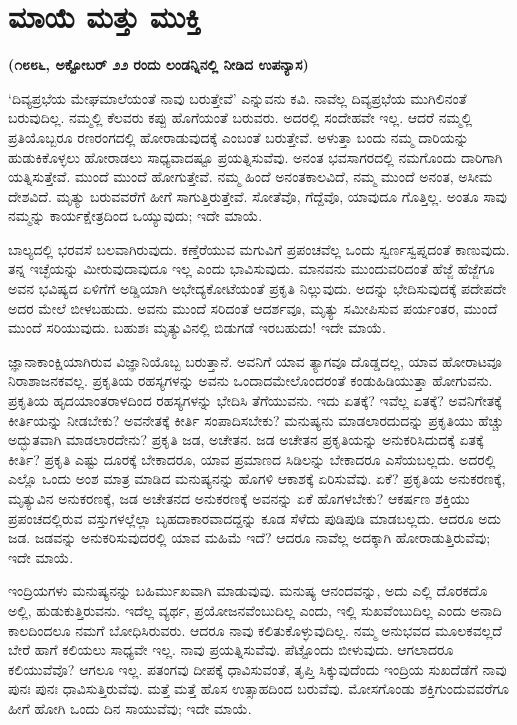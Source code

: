 \chapter{ಮಾಯೆ ಮತ್ತು ಮುಕ್ತಿ}

\centerline{\textbf{(೧೮೮೬, ಅಕ್ಟೋಬರ್​ ೨೨ ರಂದು ಲಂಡನ್ನಿನಲ್ಲಿ ನೀಡಿದ ಉಪನ್ಯಾಸ)}}

\vskip 0.2cm

‘ದಿವ್ಯಪ್ರಭೆಯ ಮೇಘಮಾಲೆಯಂತೆ ನಾವು ಬರುತ್ತೇವೆ’ ಎನ್ನುವನು ಕವಿ. ನಾವೆಲ್ಲ ದಿವ್ಯಪ್ರಭೆಯ ಮುಗಿಲಿನಂತೆ ಬರುವುದಿಲ್ಲ. ನಮ್ಮಲ್ಲಿ ಕೆಲವರು ಕಪ್ಪು ಹೊಗೆಯಂತೆ ಬರುವರು. ಅದರಲ್ಲಿ ಸಂದೇಹವೇ ಇಲ್ಲ. ಆದರೆ ನಮ್ಮಲ್ಲಿ ಪ್ರತಿಯೊಬ್ಬರೂ ರಣರಂಗದಲ್ಲಿ ಹೋರಾಡುವುದಕ್ಕೆ ಎಂಬಂತೆ ಬರುತ್ತೇವೆ. ಅಳುತ್ತಾ ಬಂದು ನಮ್ಮ ದಾರಿಯನ್ನು ಹುಡುಕಿಕೊಳ್ಳಲು ಹೋರಾಡಲು ಸಾಧ್ಯವಾದಷ್ಟೂ ಪ್ರಯತ್ನಿಸುವೆವು. ಅನಂತ ಭವಸಾಗರದಲ್ಲಿ ನಮಗೊಂದು ದಾರಿಗಾಗಿ ಯತ್ನಿಸುತ್ತೇವೆ. ಮುಂದೆ ಮುಂದೆ ಹೋಗುತ್ತೇವೆ. ನಮ್ಮ ಹಿಂದೆ ಅನಂತಕಾಲವಿದೆ, ನಮ್ಮ ಮುಂದೆ ಅನಂತ, ಅಸೀಮ ದೇಶವಿದೆ. ಮೃತ್ಯು ಬರುವವರೆಗೆ ಹೀಗೆ ಸಾಗುತ್ತಿರುತ್ತೇವೆ. ಸೋತೆವೊ, ಗೆದ್ದೆವೊ, ಯಾವುದೂ ಗೊತ್ತಿಲ್ಲ. ಅಂತೂ ಸಾವು ನಮ್ಮನ್ನು ಕಾರ್ಯಕ್ಷೇತ್ರದಿಂದ ಒಯ್ಯುವುದು; ಇದೇ ಮಾಯೆ.

\vskip 0.2cm

ಬಾಲ್ಯದಲ್ಲಿ ಭರವಸೆ ಬಲವಾಗಿರುವುದು. ಕಣ್ತೆರೆಯುವ ಮಗುವಿಗೆ ಪ್ರಪಂಚವೆಲ್ಲ ಒಂದು ಸ್ವರ್ಣಸ್ವಪ್ನದಂತೆ ಕಾಣುವುದು. ತನ್ನ ಇಚ್ಛೆಯನ್ನು ಮೀರುವುದಾವುದೂ ಇಲ್ಲ ಎಂದು ಭಾವಿಸುವುದು. ಮಾನವನು ಮುಂದುವರಿದಂತೆ ಹೆಜ್ಜೆ ಹೆಜ್ಜೆಗೂ ಅವನ ಭವಿಷ್ಯದ ಏಳಿಗೆಗೆ ಅಡ್ಡಿಯಾಗಿ ಅಭೇದ್ಯಕೋಟೆಯಂತೆ ಪ್ರಕೃತಿ ನಿಲ್ಲುವುದು. ಅದನ್ನು ಭೇದಿಸುವುದಕ್ಕೆ ಪದೇಪದೇ ಅದರ ಮೇಲೆ ಬೀಳಬಹುದು. ಅವನು ಮುಂದೆ ಸರಿದಂತೆ ಆದರ್ಶವೂ, ಮೃತ್ಯು ಸಮೀಪಿಸುವ ಪರ್ಯಂತರ, ಮುಂದೆ ಮುಂದೆ ಸರಿಯುವುದು. ಬಹುಶಃ ಮೃತ್ಯುವಿನಲ್ಲಿ ಬಿಡುಗಡೆ ಇರಬಹುದು! ಇದೇ ಮಾಯೆ.

\vskip 0.2cm

ಜ್ಞಾನಾಕಾಂಕ್ಷಿಯಾಗಿರುವ ವಿಜ್ಞಾನಿಯೊಬ್ಬ ಬರುತ್ತಾನೆ. ಅವನಿಗೆ ಯಾವ ತ್ಯಾಗವೂ ದೊಡ್ಡದಲ್ಲ, ಯಾವ ಹೋರಾಟವೂ ನಿರಾಶಾಜನಕವಲ್ಲ. ಪ್ರಕೃತಿಯ ರಹಸ್ಯಗಳನ್ನು ಅವನು ಒಂದಾದಮೇಲೊಂದರಂತೆ ಕಂಡುಹಿಡಿಯುತ್ತಾ ಹೋಗುವನು. ಪ್ರಕೃತಿಯ ಹೃದಯಾಂತರಾಳದಿಂದ ರಹಸ್ಯಗಳನ್ನು ಭೇದಿಸಿ ತೆಗೆಯುವನು. ಇದು ಏತಕ್ಕೆ? ಇವೆಲ್ಲ ಏತಕ್ಕೆ? ಅವನಿಗೇತಕ್ಕೆ ಕೀರ್ತಿಯನ್ನು ನೀಡಬೇಕು? ಅವನೇತಕ್ಕೆ ಕೀರ್ತಿ ಸಂಪಾದಿಸಬೇಕು? ಮನುಷ್ಯನು ಮಾಡಲಾರದುದನ್ನು ಪ್ರಕೃತಿಯು ಹೆಚ್ಚು ಅದ್ಭುತವಾಗಿ ಮಾಡಲಾರದೇನು? ಪ್ರಕೃತಿ ಜಡ, ಅಚೇತನ. ಜಡ ಅಚೇತನ ಪ್ರಕೃತಿಯನ್ನು ಅನುಕರಿಸಿದುದಕ್ಕೆ ಏತಕ್ಕೆ ಕೀರ್ತಿ? ಪ್ರಕೃತಿ ಎಷ್ಟು ದೂರಕ್ಕೆ ಬೇಕಾದರೂ, ಯಾವ ಪ್ರಮಾಣದ ಸಿಡಿಲನ್ನು ಬೇಕಾದರೂ ಎಸೆಯಬಲ್ಲದು. ಅದರಲ್ಲಿ ಎಲ್ಲೊ ಒಂದು ಅಂಶ ಮಾತ್ರ ಮಾಡಿದ ಮನುಷ್ಯನನ್ನು ಹೊಗಳಿ ಆಕಾಶಕ್ಕೆ ಏರಿಸುವೆವು. ಏಕೆ? ಪ್ರಕೃತಿಯ ಅನುಕರಣಕ್ಕೆ, ಮೃತ್ಯುವಿನ ಅನುಕರಣಕ್ಕೆ, ಜಡ ಅಚೇತನದ ಅನುಕರಣಕ್ಕೆ ಅವನನ್ನು ಏಕೆ ಹೊಗಳಬೇಕು? ಆಕರ್ಷಣ ಶಕ್ತಿಯು ಪ್ರಪಂಚದಲ್ಲಿರುವ ವಸ್ತುಗಳಲ್ಲೆಲ್ಲಾ ಬೃಹದಾಕಾರವಾದದ್ದನ್ನು ಕೂಡ ಸೆಳೆದು ಪುಡಿಪುಡಿ ಮಾಡಬಲ್ಲದು. ಆದರೂ ಅದು ಜಡ. ಜಡವನ್ನು ಅನುಕರಿಸುವುದರಲ್ಲಿ ಯಾವ ಮಹಿಮೆ ಇದೆ? ಆದರೂ ನಾವೆಲ್ಲ ಅದಕ್ಕಾಗಿ ಹೋರಾಡುತ್ತಿರುವೆವು; ಇದೇ ಮಾಯೆ.

\vskip 0.2cm

ಇಂದ್ರಿಯಗಳು ಮನುಷ್ಯನನ್ನು ಬಹಿರ್ಮುಖವಾಗಿ ಮಾಡುವುವು. ಮನುಷ್ಯ ಆನಂದವನ್ನು, ಅದು ಎಲ್ಲಿ ದೊರಕದೊ ಅಲ್ಲಿ, ಹುಡುಕುತ್ತಿರುವನು. ಇದೆಲ್ಲ ವ್ಯರ್ಥ, ಪ್ರಯೋಜನವೆಂಬುದಿಲ್ಲ ಎಂದು, ಇಲ್ಲಿ ಸುಖವೆಂಬುದಿಲ್ಲ ಎಂದು ಅನಾದಿ ಕಾಲದಿಂದಲೂ ನಮಗೆ ಬೋಧಿಸಿರುವರು. ಆದರೂ ನಾವು ಕಲಿತುಕೊಳ್ಳುವುದಿಲ್ಲ. ನಮ್ಮ ಅನುಭವದ ಮೂಲಕವಲ್ಲದೆ ಬೇರೆ ಹಾಗೆ ಕಲಿಯಲು ಸಾಧ್ಯವೇ ಇಲ್ಲ. ನಾವು ಪ್ರಯತ್ನಿಸುವೆವು. ಪೆಟ್ಟೊಂದು ಬೀಳುವುದು. ಆಗಲಾದರೂ ಕಲಿಯುವೆವೊ? ಆಗಲೂ ಇಲ್ಲ. ಪತಂಗವು ದೀಪಕ್ಕೆ ಧಾವಿಸುವಂತೆ, ತೃಪ್ತಿ ಸಿಕ್ಕುವುದೆಂದು ಇಂದ್ರಿಯ ಸುಖದೆಡೆಗೆ ನಾವು ಪುನಃ ಪುನಃ ಧಾವಿಸುತ್ತಿರುವೆವು. ಮತ್ತೆ ಮತ್ತೆ ಹೊಸ ಉತ್ಸಾಹದಿಂದ ಬರುವೆವು. ಮೋಸಗೊಂಡು ಶಕ್ತಿಗುಂದುವವರೆಗೂ ಹೀಗೆ ಹೋಗಿ ಒಂದು ದಿನ ಸಾಯುವೆವು; ಇದೇ ಮಾಯೆ.

